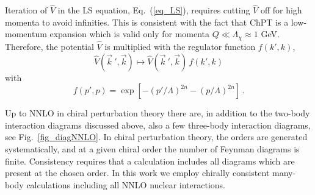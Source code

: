 Iteration of $\widehat V$ in the LS equation, Eq.~(\ref{eq_LS}),
requires cutting $\widehat V$ off for high momenta to avoid
infinities.  This is consistent with the fact that ChPT is a
low-momentum expansion which is valid only for momenta $Q \ll
\Lambda_\chi \approx 1$ GeV.  Therefore, the potential $\widehat V$ is
multiplied with the regulator function $f(k',k)$,
\begin{equation}
{\widehat V}(\vec{ k}~',{\vec k}) \longmapsto {\widehat V}(\vec{
  k}~',{\vec k}) \, f(k',k)
\end{equation}
with
\begin{equation}
f(p',p) = \exp[-(p'/\Lambda)^{2n}-(p/\Lambda)^{2n}] \,.
\label{eq:eq_f}
\end{equation}


Up to NNLO in chiral perturbation theory there are, in addition to the
two-body interaction diagrams discussed above, also a few three-body
interaction diagrams, see Fig.~\ref{fig_diagNNLO}. In chiral
perturbation theory, the orders are generated systematically, and at a
given chiral order the number of Feynman diagrams is
finite. Consistency requires that a calculation includes all diagrams
which are present at the chosen order. In this work we employ chirally
consistent many-body calculations including all NNLO nuclear
interactions.


